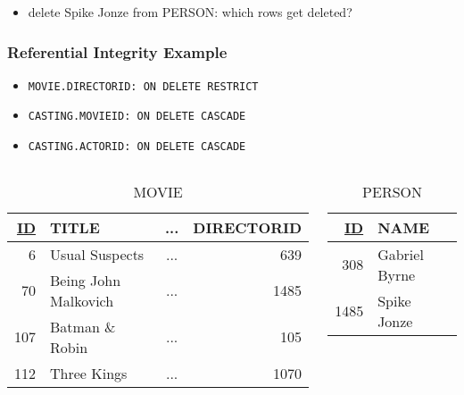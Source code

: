 \documentclass[dvipsnames]{beamer}
\theoremstyle{plain}
\begin{document}
\begin{frame}
  \begin{itemize}
    \item delete Spike Jonze from PERSON: which rows get deleted?
  \end{itemize}
\end{frame}

\begin{frame}
  \frametitle{Referential Integrity Example}

  \begin{itemize}
    \item \lstinline!MOVIE.DIRECTORID: ON DELETE RESTRICT!
    \item \lstinline!CASTING.MOVIEID: ON DELETE CASCADE!
    \item \lstinline!CASTING.ACTORID: ON DELETE CASCADE!
  \end{itemize}

  \vspace{-24pt}
  \begin{columns}
    \begin{tiny}
    \begin{table}
      \caption{MOVIE}
      \begin{tabular}{|r|l|c|r|}\hline
\underline{ID} & TITLE             & ... & DIRECTORID\\[2pt]\hline\hline
          6 & Usual Suspects       & ... &        639\\\hline
         70 & Being John Malkovich & ... &       1485\\\hline
        107 & Batman \& Robin      & ... &        105\\\hline
        112 & Three Kings          & ... &       1070\\\hline
      \end{tabular}
    \end{table}
    \end{tiny}

    \begin{tiny}
    \begin{table}
      \caption{PERSON}
      \begin{tabular}{|r|l|}\hline
\underline{ID} & NAME\\[2pt]\hline\hline
           308 & Gabriel Byrne\\\hline
          1485 & Spike Jonze  \\\hline
      \end{tabular}
    \end{table}
    \end{tiny}
  \end{columns}


\end{frame}
\end{document}
